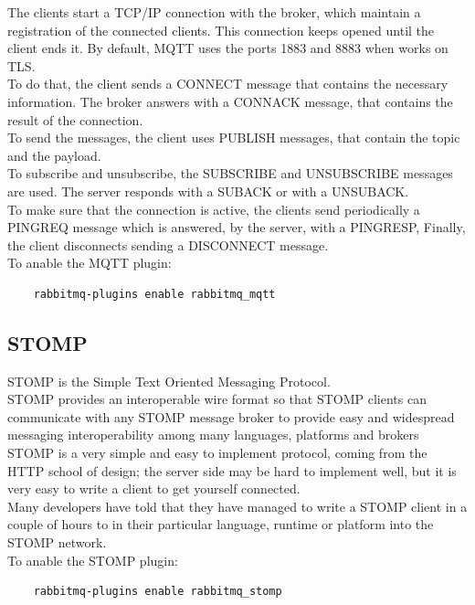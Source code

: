 \documentclass[12pt]{article}
\begin{document}
The clients start a TCP/IP connection with the broker, which maintain a registration of the connected clients. This connection keeps opened until the client ends it. By default, MQTT uses the ports 1883 and 8883 when works on TLS.\\
To do that, the client sends a CONNECT message that contains the necessary information. The broker answers with a CONNACK message, that contains the result of the connection.\\
To send the messages, the client uses PUBLISH messages, that contain the topic and the payload.\\
To subscribe and unsubscribe, the SUBSCRIBE and UNSUBSCRIBE messages are used. The server responds with a SUBACK or with a UNSUBACK.\\
To make sure that the connection is active, the clients send periodically a PINGREQ message which is answered, by the server, with a PINGRESP, Finally, the client disconnects sending a DISCONNECT message.\\
To anable the MQTT plugin:
\begin{lstlisting}
    rabbitmq-plugins enable rabbitmq_mqtt
\end{lstlisting}

\subsection*{STOMP}
STOMP is the Simple Text Oriented Messaging Protocol.\\
STOMP provides an interoperable wire format so that STOMP clients can communicate with any STOMP message broker to provide easy and widespread messaging interoperability among many languages, platforms and brokers\\
STOMP is a very simple and easy to implement protocol, coming from the HTTP school of design; the server side may be hard to implement well, but it is very easy to write a client to get yourself connected.\\
Many developers have told that they have managed to write a STOMP client in a couple of hours to in their particular language, runtime or platform into the STOMP network.\\
To anable the STOMP plugin:
\begin{lstlisting}
    rabbitmq-plugins enable rabbitmq_stomp
\end{lstlisting}
\end{document}
